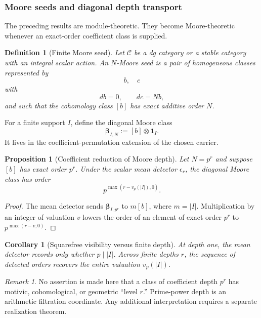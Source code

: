 \documentclass[11pt]{article}
\newtheorem{proposition}[theorem]{Proposition}
\newtheorem{corollary}[theorem]{Corollary}
\newtheorem{definition}[theorem]{Definition}
\theoremstyle{remark}
\newtheorem{remark}[theorem]{Remark}
\begin{document}
\subsubsection{Moore seeds and diagonal depth transport}

The preceding results are module-theoretic.  They become Moore-theoretic whenever an exact-order coefficient class is supplied.

\begin{definition}[Finite Moore seed]
Let \(\mathcal C\) be a dg category or a stable category with an integral scalar action.  An \(N\)-Moore seed is a pair of homogeneous classes represented by
\[
 b,\quad c
\]
with
\[
 db=0,
 \qquad
 dc=Nb,
\]
and such that the cohomology class \([b]\) has exact additive order \(N\).
\end{definition}

For a finite support \(I\), define the diagonal Moore class
\[
 \boldsymbol\beta_{I,N}:=[b]\otimes\mathbf1_I.
\]
It lives in the coefficient-permutation extension of the chosen carrier.

\begin{proposition}[Coefficient reduction of Moore depth]\label{P1C-prop:moore-depth-reduction}
Let \(N=p^r\) and suppose \([b]\) has exact order \(p^r\).  Under the scalar mean detector \(\epsilon_r\), the diagonal Moore class has order
\[
 \boxed{
 p^{\max(r-v_p(|I|),0)}.}
\]
\end{proposition}

\begin{proof}
The mean detector sends \(\boldsymbol\beta_{I,p^r}\) to \(m[b]\), where \(m=|I|\).  Multiplication by an integer of valuation \(v\) lowers the order of an element of exact order \(p^r\) to \(p^{\max(r-v,0)}\).
\end{proof}

\begin{corollary}[Squarefree visibility versus finite depth]\label{P1C-cor:squarefree-vs-depth}
At depth one, the mean detector records only whether \(p\mid |I|\).  Across finite depths \(r\), the sequence of detected orders recovers the entire valuation \(v_p(|I|)\).
\end{corollary}

\begin{remark}
No assertion is made here that a class of coefficient depth \(p^r\) has motivic, cohomological, or geometric ``level \(r\).''  Prime-power depth is an arithmetic filtration coordinate.  Any additional interpretation requires a separate realization theorem.
\end{remark}
\end{document}
